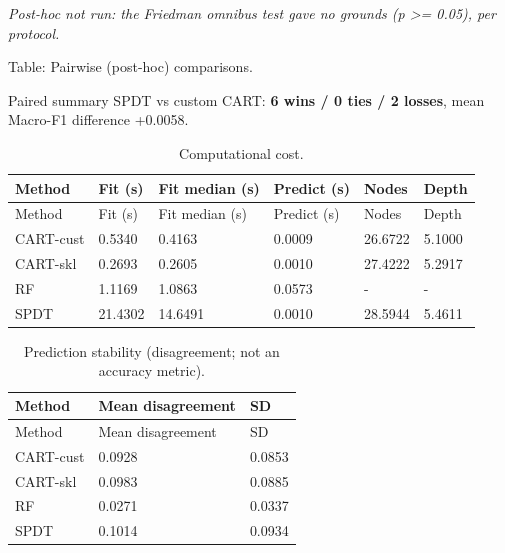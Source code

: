 \documentclass[
  conference]{IEEEtran}
\begin{document}
\emph{Post-hoc not run: the Friedman omnibus test gave no grounds (p
\textgreater= 0.05), per protocol.}

Table: Pairwise (post-hoc) comparisons.

Paired summary SPDT vs custom CART: \textbf{6 wins / 0 ties / 2 losses},
mean Macro-F1 difference +0.0058.

\begin{longtable}[]{@{}llllll@{}}
\caption{Computational cost.}\tabularnewline
\toprule\noalign{}
Method & Fit (s) & Fit median (s) & Predict (s) & Nodes & Depth \\
\midrule\noalign{}
\endfirsthead
\toprule\noalign{}
Method & Fit (s) & Fit median (s) & Predict (s) & Nodes & Depth \\
\midrule\noalign{}
\endhead
\bottomrule\noalign{}
\endlastfoot
CART-cust & 0.5340 & 0.4163 & 0.0009 & 26.6722 & 5.1000 \\
CART-skl & 0.2693 & 0.2605 & 0.0010 & 27.4222 & 5.2917 \\
RF & 1.1169 & 1.0863 & 0.0573 & - & - \\
SPDT & 21.4302 & 14.6491 & 0.0010 & 28.5944 & 5.4611 \\
\end{longtable}

\begin{longtable}[]{@{}lll@{}}
\caption{Prediction stability (disagreement; not an accuracy
metric).}\tabularnewline
\toprule\noalign{}
Method & Mean disagreement & SD \\
\midrule\noalign{}
\endfirsthead
\toprule\noalign{}
Method & Mean disagreement & SD \\
\midrule\noalign{}
\endhead
\bottomrule\noalign{}
\endlastfoot
CART-cust & 0.0928 & 0.0853 \\
CART-skl & 0.0983 & 0.0885 \\
RF & 0.0271 & 0.0337 \\
SPDT & 0.1014 & 0.0934 \\
\end{longtable}
\end{document}
